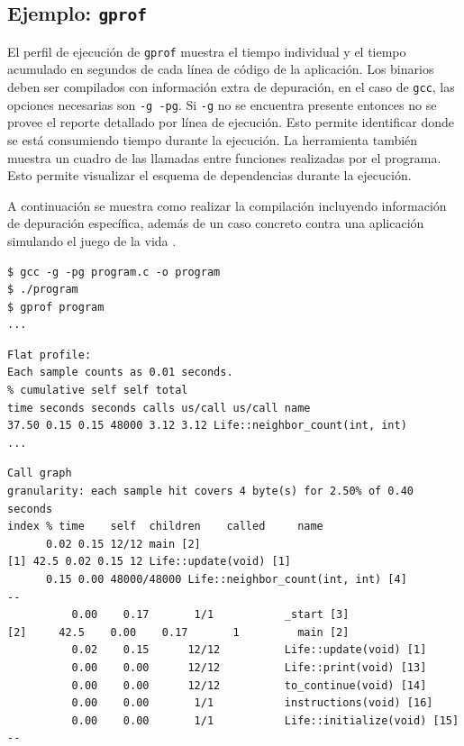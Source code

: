 \documentclass[a4paper]{report}
\begin{document}
\subsection{Ejemplo: {\tt gprof}}

El perfil de ejecución de {\tt gprof} muestra el tiempo individual y el tiempo acumulado en segundos de cada línea de código de la aplicación. Los binarios deben ser compilados con información extra de depuración, en el caso de {\tt gcc}, las opciones necesarias son {\tt -g -pg}. Si {\tt -g} no se encuentra presente entonces no se provee el reporte detallado por línea de ejecución. Esto permite identificar donde se está consumiendo tiempo durante la ejecución.
La herramienta también muestra un cuadro de las llamadas entre funciones realizadas por el programa.
Esto permite visualizar el esquema de dependencias durante la ejecución.

\bigskip

A continuación se muestra como realizar la compilación incluyendo información de depuración específica, además de un caso concreto contra una aplicación simulando el juego de la vida \cite{conway}.

\begin{lstlisting} 
$ gcc -g -pg program.c -o program
$ ./program
$ gprof program
...
\end{lstlisting}

\begin{lstlisting} 
Flat profile:
Each sample counts as 0.01 seconds.
% cumulative self self total
time seconds seconds calls us/call us/call name
37.50 0.15 0.15 48000 3.12 3.12 Life::neighbor_count(int, int)
...
\end{lstlisting}

\begin{lstlisting} 
Call graph
granularity: each sample hit covers 4 byte(s) for 2.50% of 0.40 seconds
index % time    self  children    called     name
      0.02 0.15 12/12 main [2]
[1] 42.5 0.02 0.15 12 Life::update(void) [1]
      0.15 0.00 48000/48000 Life::neighbor_count(int, int) [4]
--
          0.00    0.17       1/1           _start [3]
[2]     42.5    0.00    0.17       1         main [2]
          0.02    0.15      12/12          Life::update(void) [1]
          0.00    0.00      12/12          Life::print(void) [13]
          0.00    0.00      12/12          to_continue(void) [14]
          0.00    0.00       1/1           instructions(void) [16]
          0.00    0.00       1/1           Life::initialize(void) [15]
--
\end{lstlisting}
\end{document}
